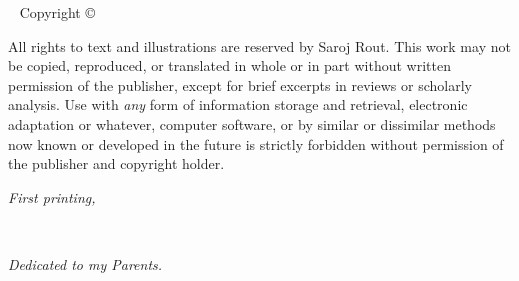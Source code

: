 \newpage\thispagestyle{empty}

\vfill
{}
\vfill

\vfill

\maketitle


\newpage
\begin{fullwidth}
~\vfill
\thispagestyle{empty}
\setlength{\parindent}{0pt}
\setlength{\parskip}{\baselineskip}
Copyright \copyright\ \the\year\ \thanklessauthor

\par{}

\par{}

\par All rights to text and illustrations are reserved by Saroj Rout. This work may not be copied, reproduced, or translated in whole or in part without written permission of the publisher, except for brief excerpts in reviews or scholarly analysis. Use with {\it any} form of information storage and retrieval, electronic adaptation or whatever, computer software, or by similar or dissimilar methods now known or developed in the future is strictly forbidden without permission of the publisher and copyright holder.

\par\textit{First printing, \monthyear}
\end{fullwidth}




\cleardoublepage
~\vfill
\begin{doublespace}
\noindent\fontsize{18}{22}\selectfont\itshape
\nohyphenation
Dedicated to my Parents.
\end{doublespace}
\vfill
\vfill